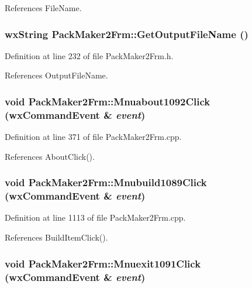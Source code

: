 References File\-Name.
\subsubsection{\setlength{\rightskip}{0pt plus 5cm}wx\-String Pack\-Maker2Frm::Get\-Output\-File\-Name ()\hspace{0.3cm}{\tt  [inline]}}\label{class_pack_maker2_frm_0e6bdb640a8bc31c8f4d26b4cbdddeb6}




Definition at line 232 of file Pack\-Maker2Frm.h.

References Output\-File\-Name.
\subsubsection{\setlength{\rightskip}{0pt plus 5cm}void Pack\-Maker2Frm::Mnuabout1092Click (wx\-Command\-Event \& {\em event})}\label{class_pack_maker2_frm_5e149c20e32446dc5e97747f5fa4371d}




Definition at line 371 of file Pack\-Maker2Frm.cpp.

References About\-Click().
\subsubsection{\setlength{\rightskip}{0pt plus 5cm}void Pack\-Maker2Frm::Mnubuild1089Click (wx\-Command\-Event \& {\em event})}\label{class_pack_maker2_frm_a2b0e30a3ef0d0391800411f0e082b6d}




Definition at line 1113 of file Pack\-Maker2Frm.cpp.

References Build\-Item\-Click().
\subsubsection{\setlength{\rightskip}{0pt plus 5cm}void Pack\-Maker2Frm::Mnuexit1091Click (wx\-Command\-Event \& {\em event})}\label{class_pack_maker2_frm_c5d526920abbd8206ce4ffae86eacbef}




